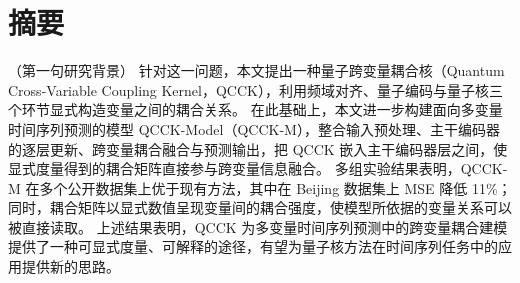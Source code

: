 
\section*{摘要}

（第一句研究背景）
针对这一问题，本文提出一种量子跨变量耦合核（Quantum Cross-Variable Coupling Kernel，QCCK），利用频域对齐、量子编码与量子核三个环节显式构造变量之间的耦合关系。
在此基础上，本文进一步构建面向多变量时间序列预测的模型 QCCK-Model（QCCK-M），整合输入预处理、主干编码器的逐层更新、跨变量耦合融合与预测输出，把 QCCK 嵌入主干编码器层之间，使显式度量得到的耦合矩阵直接参与跨变量信息融合。
多组实验结果表明，QCCK-M 在多个公开数据集上优于现有方法，其中在 Beijing 数据集上 MSE 降低 11\%；同时，耦合矩阵以显式数值呈现变量间的耦合强度，使模型所依据的变量关系可以被直接读取。
上述结果表明，QCCK 为多变量时间序列预测中的跨变量耦合建模提供了一种可显式度量、可解释的途径，有望为量子核方法在时间序列任务中的应用提供新的思路。
